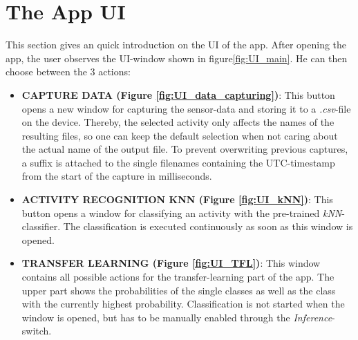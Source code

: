 \documentclass[journal]{IEEEtran}
\begin{document}
\section{The App UI}
This section gives an quick introduction on the UI of the app.\newline
After opening the app, the user observes the UI-window shown in figure\ref{fig:UI_main}.
He can then choose between the 3 actions:
\begin{itemize}
    \item \textbf{CAPTURE DATA (Figure \ref{fig:UI_data_capturing})}: \newline
    This button opens a new window for capturing the sensor-data and storing it to a 
    \textit{.csv}-file on the device. Thereby, the selected activity only
    affects the names of the resulting files, so one can keep the default selection
    when not caring about the actual name of the output file.
    To prevent overwriting previous captures, a suffix is attached to the single filenames
    containing the UTC-timestamp from the start of the capture in milliseconds. 

    \item \textbf{ACTIVITY RECOGNITION KNN (Figure \ref{fig:UI_kNN})}:\newline
    This button opens a window
    for classifying an activity with the pre-trained \textit{kNN}-classifier. 
    The classification is executed continuously as soon as this window is opened.

    \item \textbf{TRANSFER LEARNING (Figure \ref{fig:UI_TFL})}:\newline
    This window contains all possible actions for the transfer-learning
    part of the app. The upper part shows the probabilities of the single classes
    as well as the class with the currently highest probability.
    Classification is not started when the window is opened, but has to be
    manually enabled through the \textit{Inference}-switch. \newline


\end{itemize}
\end{document}

